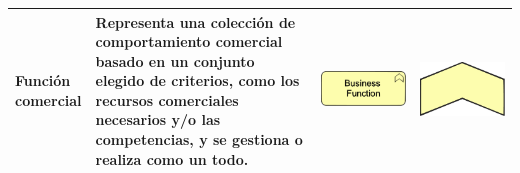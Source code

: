 \begin{longtable}{|p{0.15\linewidth}|p{0.45\linewidth}|p{0.2\linewidth} p{0.2\linewidth}|}
    Función comercial
    &
    Representa una colección de comportamiento comercial basado en un conjunto elegido de criterios, como los recursos comerciales necesarios y/o las competencias, y se gestiona o realiza como un todo.
    &
\begin{center}
    \includegraphics[width=1\linewidth]{imgs/capa_de_negocios/6.pdf}
\end{center} &
\begin{center}
    \includegraphics[width=0.5\linewidth]{imgs/capa_de_negocios/a6.pdf}
\end{center}
    \\ \hline


\end{longtable}
